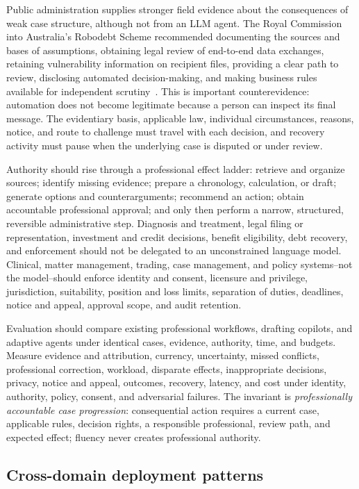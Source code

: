Public administration supplies stronger field evidence about the consequences of weak case structure, although not from an LLM agent. The Royal Commission into Australia's Robodebt Scheme recommended documenting the sources and bases of assumptions, obtaining legal review of end-to-end data exchanges, retaining vulnerability information on recipient files, providing a clear path to review, disclosing automated decision-making, and making business rules available for independent scrutiny~\cite{robodebt2023report}. This is important counterevidence: automation does not become legitimate because a person can inspect its final message. The evidentiary basis, applicable law, individual circumstances, reasons, notice, and route to challenge must travel with each decision, and recovery activity must pause when the underlying case is disputed or under review.

Authority should rise through a professional effect ladder: retrieve and organize sources; identify missing evidence; prepare a chronology, calculation, or draft; generate options and counterarguments; recommend an action; obtain accountable professional approval; and only then perform a narrow, structured, reversible administrative step. Diagnosis and treatment, legal filing or representation, investment and credit decisions, benefit eligibility, debt recovery, and enforcement should not be delegated to an unconstrained language model. Clinical, matter management, trading, case management, and policy systems--not the model--should enforce identity and consent, licensure and privilege, jurisdiction, suitability, position and loss limits, separation of duties, deadlines, notice and appeal, approval scope, and audit retention.

Evaluation should compare existing professional workflows, drafting copilots, and adaptive agents under identical cases, evidence, authority, time, and budgets. Measure evidence and attribution, currency, uncertainty, missed conflicts, professional correction, workload, disparate effects, inappropriate decisions, privacy, notice and appeal, outcomes, recovery, latency, and cost under identity, authority, policy, consent, and adversarial failures. The invariant is \emph{professionally accountable case progression}: consequential action requires a current case, applicable rules, decision rights, a responsible professional, review path, and expected effect; fluency never creates professional authority.

\subsection{Cross-domain deployment patterns}

